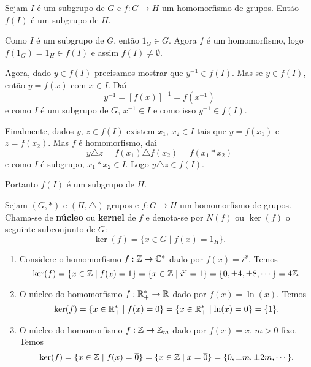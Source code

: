 \begin{proposicao}
	Sejam $I$ \'e um subgrupo de $G$ e $f : G \to H$ um homomorfismo de grupos. Ent\~ao $f(I)$ \'e um subgrupo de $H$.
\end{proposicao}
\begin{prova}
	Como $I$ \'e um subgrupo de $G$, ent\~ao $1_G \in G$. Agora $f$ \'e um homomorfismo, logo $f(1_G) = 1_H \in f(I)$ e assim $f(I) \ne \emptyset$.

	Agora, dado $y \in f(I)$ precisamos mostrar que $y^{-1} \in f(I)$. Mas se $y \in f(I)$, ent\~ao $y = f(x)$ com $x \in I$. Da{\'\i}
	\[
		y^{-1} = [f(x)]^{-1} = f(x^{-1})
	\]
	e como $I$ \'e um subgrupo de $G$, $x^{-1} \in I$ e como isso $y^{-1} \in f(I)$.

	Finalmente, dados $y$, $z \in f(I)$ existem $x_1$, $x_2 \in I$ tais que $y = f(x_1)$ e $z = f(x_2)$. Mas $f$ \'e homomorfismo, da{\'\i}
	\[
		y\triangle z = f(x_1)\triangle f(x_2) = f(x_1*x_2)
	\]
	e como $I$ \'e subgrupo, $x_1*x_2 \in I$. Logo $y\triangle z \in f(I)$.

	Portanto $f(I)$ \'e um subgrupo de $H$.
\end{prova}

\begin{definicao}
	Sejam $(G, *)$ e $(H, \triangle)$ grupos e $f : G \to H$ um homomorfismo de grupos. Chama-se de \textbf{n\'ucleo} ou \textbf{kernel} de $f$ e denota-se por $N(f)$ ou $\ker(f)$ o seguinte subconjunto de $G$:
	\[
		\ker(f) = \{x \in G \mid f(x) = 1_H\}.
	\]
\end{definicao}

\begin{exemplos}
	\begin{enumerate}[label={\roman*})]
		\item Considere o homomorfismo $f : \mathbb{Z} \to \mathbb{C}^*$ dado por $f(x) = i^x$. Temos
		\[
			\ker(f) = \{x \in \mathbb{Z} \mid f(x) = 1\} = \{x \in \mathbb{Z} \mid i^x = 1\} = \{0, \pm 4, \pm 8, \cdots\} = 4\mathbb{Z}.
		\]

		\item O n\'ucleo do homomorfismo $f : \mathbb{R}^*_+ \to \mathbb{R}$ dado por $f(x) = \ln(x)$. Temos
		\[
			\ker(f) = \{x \in \mathbb{R}^*_+ \mid f(x) = 0\} = \{x \in \mathbb{R}^*_+ \mid \ln(x) = 0\} = \{1\}.
		\]

		\item O n\'ucleo do homomorfismo $f : \mathbb{Z} \to \mathbb{Z}_m$ dado por $f(x) = \overline{x}$, $m > 0$ fixo. Temos
		\[
			\ker(f) = \{x \in \mathbb{Z} \mid f(x) = \overline{0}\} = \{x \in \mathbb{Z} \mid \overline{x} = \overline{0}\} = \{0, \pm m, \pm 2m, \cdots\}.
		\]
	\end{enumerate}
\end{exemplos}

